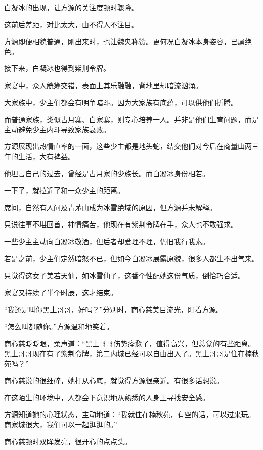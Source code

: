 
\begin{this_body}

白凝冰的出现，让方源的关注度顿时骤降。

这前后差距，对比太大，由不得人不注目。

方源即便相貌普通，刚出来时，也让魏央称赞。更何况白凝冰本身姿容，已属绝色。

接下来，白凝冰也得到紫荆令牌。

家宴中，众人觥筹交错，表面上其乐融融，背地里却暗流汹涌。

大家族中，少主们都会有明争暗斗。因为大家族有底蕴，可以供他们折腾。

而普通家族，类似古月寨、白家寨，则专心培养一人。并非是他们生育问题，而是主动避免少主内斗导致家族衰败。

方源展现出热情直率的一面，这些少主都是地头蛇，结交他们对今后在商量山两三年的生活，大有裨益。

他坦言自己的过去，曾经是古月家的少族长。而白凝冰身份相若。

一下子，就拉近了和一众少主的距离。

席间，自然有人问及青茅山成为冰雪绝域的原因，但方源并未解释。

只说往事不堪回首，神情痛苦，他现在有紫荆令牌在手，众人也不敢强求。

一些少主主动向白凝冰敬酒，但后者却爱理不理，仍旧我行我素。

若是之前，少主们定然暗怒不已，但如今白凝冰展露原貌，很多人都生不出气来。

只觉得这女子美若天仙，如冰雪仙子，这番个性配她这份气质，倒恰巧合适。

家宴又持续了半个时辰，这才结束。

“我还是叫你黑土哥哥，好吗？”分别时，商心慈美目流光，盯着方源。

“怎么叫都随你。”方源温和地笑着。

商心慈眨眨眼，柔声道：“黑土哥哥伤势痊愈了，值得高兴，但总觉的有些距离。黑土哥哥现在有了紫荆令牌，第二内城已经可以自由出入了。黑土哥哥是住在楠秋苑吗？”

商心慈说的很细碎，她打从心底，就觉得方源很亲近。有很多话想说。

在这陌生的环境中，人都会下意识地从熟悉的人身上寻找安全感。

方源知道她的心理状态，主动地道：“我就住在楠秋苑，有空的话，可以过来玩。商家城很大，我们可以一起逛逛的。”

商心慈顿时双眸发亮，很开心的点点头。


\end{this_body}
